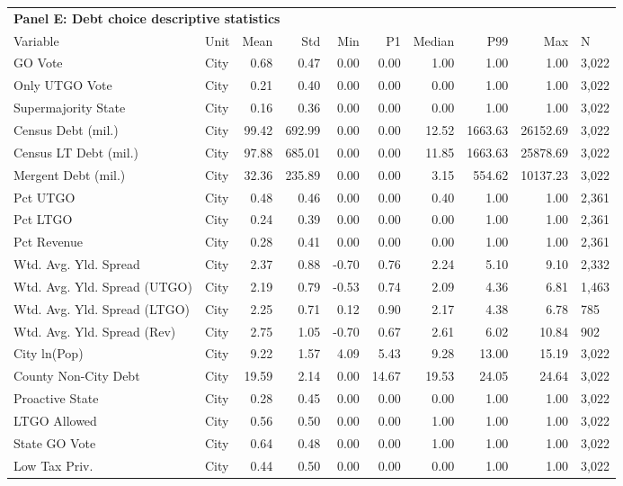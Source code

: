 \begin{table}[H]
\centering
\begin{tabular*}{\textwidth}{@{\extracolsep{\fill}}llrrrrrrrl}
\multicolumn{10}{l}{\textbf{Panel E: Debt choice descriptive statistics}}\\

\addlinespace
  \toprule
Variable & Unit & Mean & Std & Min & P1 & Median & P99 & Max & N \\ 
  \hline
GO Vote & City & 0.68 & 0.47 & 0.00 & 0.00 & 1.00 & 1.00 & 1.00 & 3,022 \\ 
  Only UTGO Vote & City & 0.21 & 0.40 & 0.00 & 0.00 & 0.00 & 1.00 & 1.00 & 3,022 \\ 
  Supermajority State & City & 0.16 & 0.36 & 0.00 & 0.00 & 0.00 & 1.00 & 1.00 & 3,022 \\ 
  Census Debt (mil.) & City & 99.42 & 692.99 & 0.00 & 0.00 & 12.52 & 1663.63 & 26152.69 & 3,022 \\ 
  Census LT Debt (mil.) & City & 97.88 & 685.01 & 0.00 & 0.00 & 11.85 & 1663.63 & 25878.69 & 3,022 \\ 
  Mergent Debt (mil.) & City & 32.36 & 235.89 & 0.00 & 0.00 & 3.15 & 554.62 & 10137.23 & 3,022 \\ 
  Pct UTGO & City & 0.48 & 0.46 & 0.00 & 0.00 & 0.40 & 1.00 & 1.00 & 2,361 \\ 
  Pct LTGO & City & 0.24 & 0.39 & 0.00 & 0.00 & 0.00 & 1.00 & 1.00 & 2,361 \\ 
  Pct Revenue & City & 0.28 & 0.41 & 0.00 & 0.00 & 0.00 & 1.00 & 1.00 & 2,361 \\ 
  Wtd. Avg. Yld. Spread & City & 2.37 & 0.88 & -0.70 & 0.76 & 2.24 & 5.10 & 9.10 & 2,332 \\ 
  Wtd. Avg. Yld. Spread (UTGO) & City & 2.19 & 0.79 & -0.53 & 0.74 & 2.09 & 4.36 & 6.81 & 1,463 \\ 
  Wtd. Avg. Yld. Spread (LTGO) & City & 2.25 & 0.71 & 0.12 & 0.90 & 2.17 & 4.38 & 6.78 &   785 \\ 
  Wtd. Avg. Yld. Spread (Rev) & City & 2.75 & 1.05 & -0.70 & 0.67 & 2.61 & 6.02 & 10.84 &   902 \\ 
  City ln(Pop) & City & 9.22 & 1.57 & 4.09 & 5.43 & 9.28 & 13.00 & 15.19 & 3,022 \\ 
  County Non-City Debt & City & 19.59 & 2.14 & 0.00 & 14.67 & 19.53 & 24.05 & 24.64 & 3,022 \\ 
  Proactive State & City & 0.28 & 0.45 & 0.00 & 0.00 & 0.00 & 1.00 & 1.00 & 3,022 \\ 
  LTGO Allowed & City & 0.56 & 0.50 & 0.00 & 0.00 & 1.00 & 1.00 & 1.00 & 3,022 \\ 
  State GO Vote & City & 0.64 & 0.48 & 0.00 & 0.00 & 1.00 & 1.00 & 1.00 & 3,022 \\ 
  Low Tax Priv. & City & 0.44 & 0.50 & 0.00 & 0.00 & 0.00 & 1.00 & 1.00 & 3,022 \\ 
   \hline
\end{tabular*}
\end{table}
